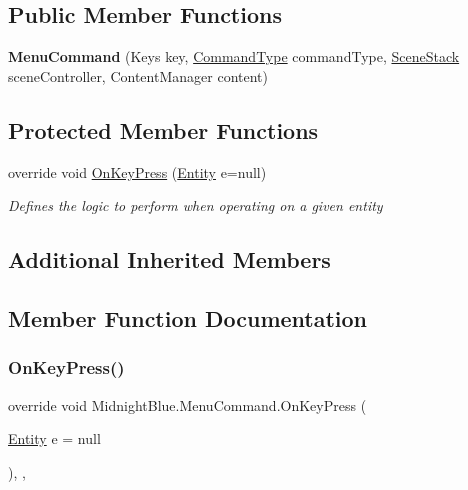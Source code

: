 \subsection*{Public Member Functions}
\begin{DoxyCompactItemize}
\item 
\hypertarget{class_midnight_blue_1_1_menu_command_ac494139f6aafe9e9d1f24b3cce518279}{}\label{class_midnight_blue_1_1_menu_command_ac494139f6aafe9e9d1f24b3cce518279} 
{\bfseries Menu\+Command} (Keys key, \hyperlink{namespace_m_b2_d_1_1_i_o_ab5f95f3fe9e652778b62bdf943168a68}{Command\+Type} command\+Type, \hyperlink{class_m_b2_d_1_1_scenes_1_1_scene_stack}{Scene\+Stack} scene\+Controller, Content\+Manager content)
\end{DoxyCompactItemize}
\subsection*{Protected Member Functions}
\begin{DoxyCompactItemize}
\item 
override void \hyperlink{class_midnight_blue_1_1_menu_command_a2101f922aa12bd7fed4eff3eb714a9d4}{On\+Key\+Press} (\hyperlink{class_m_b2_d_1_1_entity_component_1_1_entity}{Entity} e=null)
\begin{DoxyCompactList}\small\item\em Defines the logic to perform when operating on a given entity \end{DoxyCompactList}\end{DoxyCompactItemize}
\subsection*{Additional Inherited Members}


\subsection{Member Function Documentation}
\hypertarget{class_midnight_blue_1_1_menu_command_a2101f922aa12bd7fed4eff3eb714a9d4}{}\label{class_midnight_blue_1_1_menu_command_a2101f922aa12bd7fed4eff3eb714a9d4} 
\subsubsection{\texorpdfstring{On\+Key\+Press()}{OnKeyPress()}}
{\footnotesize\ttfamily override void Midnight\+Blue.\+Menu\+Command.\+On\+Key\+Press (\begin{DoxyParamCaption}\item[{\hyperlink{class_m_b2_d_1_1_entity_component_1_1_entity}{Entity}}]{e = {\ttfamily null} }\end{DoxyParamCaption})\hspace{0.3cm}{\ttfamily [inline]}, {\ttfamily [protected]}, {\ttfamily [virtual]}}



